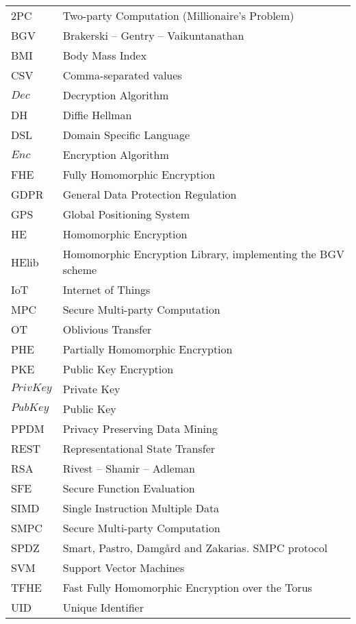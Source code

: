 \abbreviations
\begin{center}
	\renewcommand{\arraystretch}{1.5}
	\begin{longtable}{ l @{\qquad} l }
	\toprule
	2PC       & Two-party Computation (Millionaire's Problem) \\
	BGV       & Brakerski -- Gentry -- Vaikuntanathan \\
	BMI       & Body Mass Index \\
	CSV 			& Comma-separated values\\
	$Dec$     & Decryption Algorithm \\
	DH				& Diffie Hellman \\
	DSL       & Domain Specific Language \\
	$Enc$     & Encryption Algorithm \\
	FHE       & Fully Homomorphic Encryption \\
	GDPR 			& General Data Protection Regulation\\
	GPS 			& Global Positioning System \\
	HE        & Homomorphic Encryption \\
	HElib     & Homomorphic Encryption Library, implementing the BGV scheme \\
	IoT				& Internet of Things \\
	MPC 			& Secure Multi-party Computation \\
	OT        & Oblivious Transfer \\
	PHE       & Partially Homomorphic Encryption \\
	PKE 			& Public Key Encryption \\
	$PrivKey$	& Private Key \\
	$PubKey$  & Public Key \\
	PPDM      & Privacy Preserving Data Mining \\
	REST      & Representational State Transfer \\
	RSA				& Rivest -- Shamir -- Adleman \\
	SFE       & Secure Function Evaluation \\
	SIMD      & Single Instruction Multiple Data \\
	SMPC 			& Secure Multi-party Computation \\
	SPDZ      & Smart, Pastro, Damg{\aa}rd and Zakarias. SMPC protocol \\
	SVM 			& Support Vector Machines \\
	TFHE      & Fast Fully Homomorphic Encryption over the Torus \\
	UID 			& Unique Identifier \\

	\bottomrule
	\end{longtable}
\end{center}
